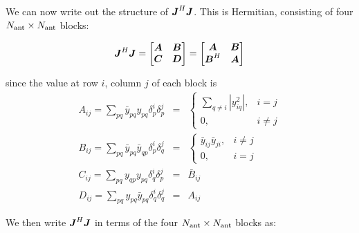 \documentclass[useAMS,usenatbib]{mn2e}
\makeatletter
\newcommand{\mat}[1]{{\bmath{#1}}}
\newcommand{\JJ}{\mat{J}} %
\newcommand{\Matrix}[2]{\left [ \begin{array}{@{}#1@{}}#2\end{array} \right ]}
\numberwithin{equation}{section} %
\providecommand{\DIFaddbegin}{} %
\providecommand{\DIFaddend}{} %
\providecommand{\DIFdelbegin}{} %
\providecommand{\DIFdelend}{} %
\makeatother
\begin{document}
\begin{equation}%
\DIFdelend \DIFaddbegin \end{equation}
\DIFaddend We can now write out the 
structure of $\JJ^H\JJ$. This is Hermitian, consisting of four $N_\mathrm{ant}\times N_\mathrm{ant}$ blocks:
\DIFdelbegin %

\DIFdelend \begin{equation}
\label{eq:JHJ:DI:ABCD}
\JJ^H\JJ = \Matrix{cc}{\mat{A}&\mat{B}\\\mat{C}&\mat{D}} = \Matrix{cc}{\mat{A}&\mat{B}\\\mat{B}^H&\mat{A}}
\end{equation}
\DIFdelbegin %

\DIFdelend since the value at row $i$, column $j$ of each block is
\begin{eqnarray}
A_{ij} = \sum_{pq} \bar{y}_{pq} y_{pq} \delta^{i}_p \delta^{j}_p &=& 
  \left \{ \begin{array}{cc}
        \sum\limits_{q\ne i} |y_{iq}^2|, & \scriptstyle i=j \\
        0,  & \scriptstyle  i\ne j
  \end{array} \right .\nonumber\\ 
B_{ij} = \sum_{pq} \bar{y}_{pq} \bar{y}_{qp} \delta^{i}_p \delta^{j}_q &=& 
  \left \{ \begin{array}{cc}
      \bar{y}_{ij} \bar{y}_{ji}, & \scriptstyle i\ne j\\
      0, & \scriptstyle i=j
  \end{array} \right .\nonumber\\ 
C_{ij} = \sum_{pq} y_{qp} y_{pq} \delta^{i}_q \delta^{j}_p &=& 
  \bar{B}_{ij} \nonumber\\
D_{ij} = \sum_{pq} y_{pq} \bar{y}_{pq} \delta^{i}_q \delta^{j}_q &=& A_{ij} 
\label{eq:JHJ:DI:ABCD1}
\end{eqnarray}

\DIFaddbegin \newcommand{\JHJblocksFull}[4]{
\Matrix{c@{}c@{}c}{
 #1 & \bigg |~ & #2 \\[10pt]
 \hline \\[-8pt]
 #3 & \bigg |~ & #4 }
}

\newcommand{\JHJblocks}[2]{
\Matrix{c@{}c@{}c}{
 #1 & \big |~ & \nearrow^H \\
 \hline \\[-8pt]
 #2 & \bigg |~ & \searrow~~ }
}

\DIFaddend We then write $\JJ^H\JJ$ in terms of the four $N_\mathrm{ant}\times N_\mathrm{ant}$ blocks as:
\DIFdelbegin %
\end{document}
